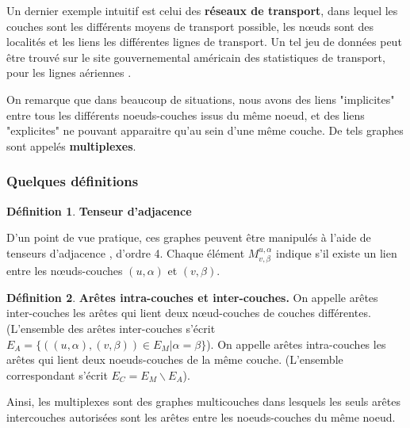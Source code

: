 \documentclass[11pt,a4paper]{article}
\theoremstyle{definition}
\newtheorem{defn}{Définition}
\theoremstyle{remark}
\theoremstyle{remark}
\begin{document}
Un dernier exemple intuitif est celui des \textbf{réseaux de transport}, dans lequel les couches sont les différents moyens de transport possible, les nœuds sont des localités et les liens les différentes lignes de transport. Un tel jeu de données peut être trouvé sur le site gouvernemental américain des statistiques de transport, pour les lignes aériennes \cite{plane}.

On remarque que dans beaucoup de situations, nous avons des liens "implicites" entre tous les différents noeuds-couches issus du même noeud, et des liens "explicites" ne pouvant apparaitre qu'au sein d'une même couche. De tels graphes sont appelés \textbf{multiplexes}.






\subsubsection{Quelques définitions}

\begin{defn}{\textbf{Tenseur d'adjacence}}
	
\end{defn}
D'un point de vue pratique, ces graphes peuvent être manipulés à l'aide de tenseurs d'adjacence \cite{mldd}, d'ordre 4. Chaque élément $M^{u,\alpha}_{v,\beta}$ indique s'il existe un lien entre les nœuds-couches $(u,\alpha)$ et $(v,\beta)$.

\begin{defn}{\textbf{Arêtes intra-couches et inter-couches.}}
	On appelle arêtes inter-couches les arêtes qui lient deux nœud-couches de couches différentes. (L'ensemble des arêtes inter-couches s'écrit $E_A = \{((u,\alpha),(v,\beta)) \in E_M | \alpha = \beta\}$). On appelle arêtes intra-couches les arêtes qui lient deux noeuds-couches de la même couche. (L'ensemble correspondant s'écrit $E_C = E_M\backslash E_A$).
\end{defn}
Ainsi, les multiplexes sont des graphes multicouches dans lesquels les seuls arêtes intercouches autorisées sont les arêtes entre les noeuds-couches du même noeud.
\end{document}
